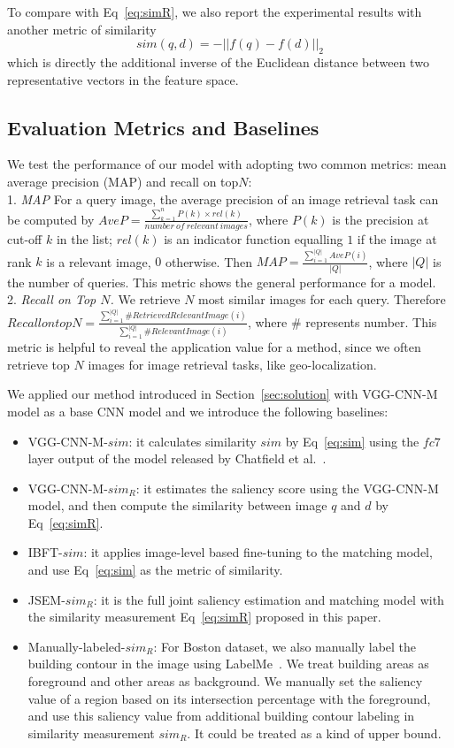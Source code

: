 To compare with Eq~\eqref{eq:simR}, we also report the experimental results with another metric of similarity
\begin{equation} 
sim(q, d) =  -||f(q) - f(d)||_2
\label{eq:sim}
\end{equation}
which is directly the additional inverse of the Euclidean distance between two representative vectors in the feature space. 

\subsection{Evaluation Metrics and Baselines}
We test the performance of our model with adopting two common metrics: mean average precision (MAP) and recall on top$N$:\\
1. \emph{MAP} For a query image, the average precision of an image retrieval task can be computed by $AveP=\frac{\sum_{k=1}^nP(k)\times rel(k)}{number~of~relevant~images}$, where $P(k)$ is the precision at cut-off $k$ in the list; $rel(k)$ is an indicator function equalling $1$ if the image at rank $k$ is a relevant image, $0$ otherwise. Then $MAP=\frac{\sum_{i=1}^{|Q|}AveP(i)}{|Q|}$, where $|Q|$ is the number of queries. This metric shows the general performance for a model. \\
2. \emph{Recall on Top $N$.} We retrieve $N$ most similar images for each query. Therefore $Recall on top N = \frac{\sum_{i=1}^{|Q|} \#RetrievedRelevantImage(i)}{\sum_{i=1}^{|Q|} \# RelevantImage(i)}$, where $\#$ represents number. This metric is helpful to reveal the application value for a method, since we often retrieve top $N$ images for image retrieval tasks, like geo-localization.

We applied our method introduced in Section~\ref{sec:solution} with VGG-CNN-M model as a base CNN model and we introduce the following baselines:
\begin{itemize}
\item VGG-CNN-M-$sim$: it calculates similarity $sim$ by Eq~\eqref{eq:sim} using the $fc7$ layer output of the model released by Chatfield et al.~\cite{chatfield2014return}. 
\item VGG-CNN-M-$sim_R$: it estimates the saliency score using the VGG-CNN-M model, and then compute the similarity between image $q$ and $d$ by Eq~\eqref{eq:simR}. 
\item IBFT-$sim$: it applies image-level based fine-tuning to the matching model, and use Eq~\eqref{eq:sim} as the metric of similarity. 
\item JSEM-$sim_R$: it is the full joint saliency estimation and matching model with the similarity measurement Eq~\eqref{eq:simR} proposed in this paper. 
\item Manually-labeled-$sim_R$: For Boston dataset, we also manually label the building contour in the image using LabelMe~\cite{Russell2008}. 
We treat building areas as foreground and other areas as background. 
We manually set the saliency value of a region based on its intersection percentage with the foreground, and use this saliency value from additional building contour labeling in similarity measurement $sim_R$. It could be treated as a kind of upper bound. 
\end{itemize}

